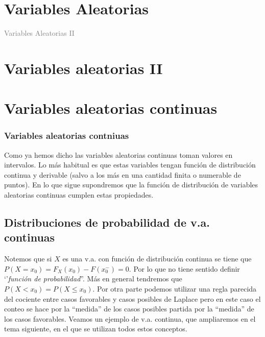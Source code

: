\documentclass[handout]{beamer}\usepackage[]{graphicx}\usepackage[]{color}
\title[\red{Matemáticas III GINF}]{}
\author[]{R. Alberich}
\date{}
\newcommand{\gray}[1]{\textcolor{gray}{#1}}
\renewcommand{\leq}{\leqslant}
\theoremstyle{plain}
\theoremstyle{definition}
\begin{document}
\beamertemplatedotitem

\lstset{breaklines=true}
\lstset{basicstyle=\ttfamily}


\section{Variables Aleatorias}

\begin{frame}
\vfill
\begin{center}
\gray{\LARGE Variables Aleatorias II}
\end{center}
\vfill
\end{frame}
\section{Variables aleatorias II}


\section{Variables aleatorias continuas}
\begin{frame}
\frametitle{Variables aleatorias contniuas}
Como ya hemos dicho las variables aleatorias continuas toman valores en
intervalos.
Lo más habitual es que estas variables tengan función de distribución continua y
derivable (salvo  a los más en una cantidad finita o numerable de puntos). En lo que
sigue supondremos que la función de distribución de variables
aleatorias continuas cumplen estas propiedades.

\end{frame}
\subsection{Distribuciones de probabilidad de v.a. continuas}

\begin{frame}
Notemos que si $X$ es una v.a. con función de distribución continua se tiene que
$P(X=x_{0})=F_X(x_0)-F(x_0^{-})=0$. Por lo que no tiene sentido definir `'\textit{función de
probabilidad}''. Más en general tendremos que $P(X<x_0)=P(X\leq x_0)$.
Por otra parte podemos utilizar una regla parecida del
cociente entre casos favorables y casos posibles de Laplace  pero en
este caso el conteo se hace por la ``medida''  de los casos
posibles partida por la ``medida'' de los casos favorables.
Veamos un ejemplo de v.a. continua, que ampliaremos en el
tema siguiente, en el que se utilizan todos estos conceptos.
\end{frame}
\end{document}
